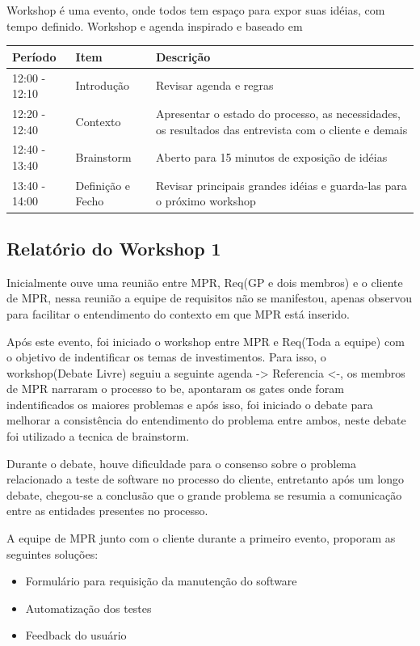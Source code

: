 Workshop é uma evento, onde todos tem espaço para expor suas idéias, com tempo definido.
Workshop e agenda inspirado e baseado em \cite{UFPRUNI2}

\begin{table}[H]
	\begin{tabular}{|l|l| p{8cm} |}
		\hline 
		Período & Item & Descrição\tabularnewline
		\hline 
		\hline 
		12:00 - 12:10 & Introdução & Revisar agenda e regras\tabularnewline
		\hline 
		12:20 - 12:40 & Contexto & Apresentar o estado do processo, as necessidades, os resultados das
		entrevista com o cliente e demais\tabularnewline
		\hline 
		12:40 - 13:40 & Brainstorm & Aberto para 15 minutos de exposição de idéias\tabularnewline
		\hline 
		13:40 - 14:00 & Definição e Fecho & Revisar principais grandes idéias e guarda-las para o próximo workshop\tabularnewline
		\hline 
	\end{tabular}
\end{table}

\subsection{Relatório do Workshop 1}

Inicialmente ouve uma reunião entre MPR, Req(GP e dois membros) e o cliente de MPR, nessa reunião a equipe de requisitos não se manifestou, apenas observou para facilitar o entendimento do contexto em que MPR está inserido.

Após este evento, foi iniciado o workshop entre MPR e Req(Toda a equipe) com o objetivo de indentificar os temas de investimentos. Para isso, o workshop(Debate Livre) seguiu a seguinte agenda -> Referencia <-, os membros de MPR narraram o processo to be, apontaram os gates onde foram indentificados os maiores problemas e após isso, foi iniciado o debate para melhorar a consistência do entendimento do problema entre ambos, neste debate foi utilizado a tecnica de brainstorm. 

Durante o debate, houve dificuldade para o consenso sobre o problema relacionado a teste de software no processo do cliente, entretanto após um longo debate, chegou-se a conclusão que o grande problema se resumia a comunicação entre as entidades presentes no processo.

A equipe de MPR junto com o cliente durante a primeiro evento, proporam as seguintes soluções:

\begin{itemize}
	\item Formulário para requisição da manutenção do software

	\item Automatização dos testes

	\item Feedback do usuário
\end{itemize}

